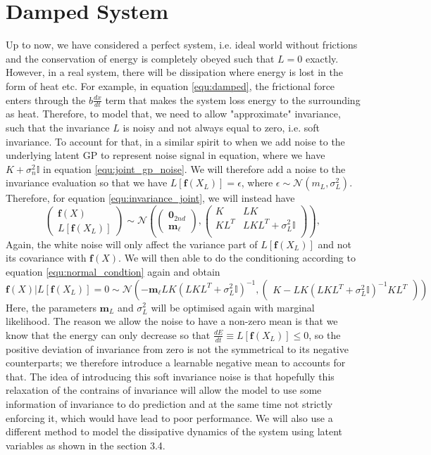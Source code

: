 \documentclass{statsmsc}
\begin{document}
\section{Damped System}
Up to now, we have considered a perfect system, i.e. ideal world without frictions and the conservation of energy is completely obeyed such that $L=0$ exactly.
However, in a real system, there will be dissipation where energy is lost in the form of heat etc.  
For example, in equation \ref{equ:damped}, the frictional force enters through the $b\frac{dx}{dt}$ term that makes the system loss energy to the surrounding as heat.  
Therefore, to model that, we need to allow "approximate" invariance, such that the invariance $L$ is noisy and not always equal to zero, i.e. soft invariance.
To account for that, in a similar spirit to when we add noise to the underlying latent GP to represent noise signal in equation, where we have $K+\sigma_n^2 \mathbb{I}$ in equation \ref{equ:joint_gp_noise}.
We will therefore add a noise to the invariance evaluation so that we have $L[\mathbf{f}(X_L)]=\epsilon$, where $\epsilon\sim\mathcal{N}(m_L, \sigma_L^2)$.
Therefore, for equation \ref{equ:invariance_joint}, we will instead have 
$$
\begin{pmatrix}
\mathbf{f}(X)\\L[\mathbf{f}(X_L)]
\end{pmatrix}
\sim\mathcal{N}
\left(\begin{pmatrix}\mathbf{0}_{2nd}\\\mathbf{m}_{\ell}\end{pmatrix}, \begin{pmatrix}
    K & LK \\
    KL^T & LKL^T+\sigma_L^2\mathbb{I}\\
\end{pmatrix}\right),
$$
Again, the white noise will only affect the variance part of $L[\mathbf{f}(X_L)]$ and not its covariance with $\mathbf{f}(X)$.
We will then able to do the conditioning according to equation \ref{equ:normal_condtion} again and obtain
$$
  \mathbf{f}(X)|L[\mathbf{f}(X_L)]=0 \sim \mathcal{N} \left(-\mathbf{m}_\ell LK(LKL^T+\sigma^2_L\mathbb{I})^{-1}, \begin{pmatrix}
    K-LK(LKL^T+\sigma^2_L\mathbb{I})^{-1}KL^T
  \end{pmatrix}\right)
$$
Here, the parameters $\mathbf{m}_L$ and $\sigma^2_L$ will be optimised again with marginal likelihood. 
The reason we allow the noise to have a non-zero mean is that we know that the energy can only decrease so that $\frac{dE}{dt}\equiv L[\mathbf{f}(X_L)] \le 0 $, so the positive deviation of invariance from zero is not the symmetrical to its negative counterparts; we therefore introduce a learnable negative mean to accounts for that.  
The idea of introducing this soft invariance noise is that hopefully this relaxation of the contrains of invariance will allow the model to use some information of invariance to do prediction and at the same time not strictly enforcing it, which would have lead to poor performance. 
We will also use a different method to model the dissipative dynamics of the system using latent variables as shown in the section 3.4. 
\end{document}
